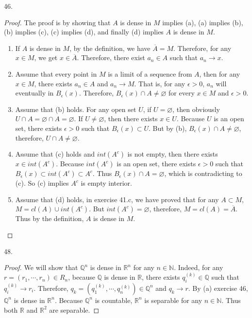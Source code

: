 \documentclass[12pt, a4paper]{article}
\theoremstyle{plain}
\newcommand{\N}{\mathbb{N}}
\newcommand{\Q}{\mathbb{Q}}
\newcommand{\R}{\mathbb{R}}
\begin{document}
46.
\begin{proof}
The proof is by showing that $A$ is dense in $M$ implies (a), (a) implies (b), (b) implies (c), (c) implies (d), and finally (d) implies $A$ is dense in $M$.
\hfill
\begin{enumerate}[label=(\roman*)]
\item If $A$ is dense in $M$, by the definition, we have $\overline{A}=M$. Therefore, for any $x\in M$, we get $x\in \overline{A}$. Therefore, there exist $a_n\in A$ such that $a_n\rightarrow x$.

\item Assume that every point in $M$ is a limit of a sequence from $A$, then for any $x\in M$, there exists $a_n\in A$ and $a_n\rightarrow M$. That is, for any $\epsilon>0$, $a_n$ will eventually in $B_\epsilon(x)$. Therefore, $B_\epsilon(x)\cap A\neq \varnothing$ for every $x\in M$ and $\epsilon>0$.

\item Assume that (b) holds. For any open set $U$, if $U=\varnothing$, then obviously $U\cap A=\varnothing\cap A=\varnothing$. If $U\neq \varnothing$, then there exists $x\in U$. Because $U$ is an open set, there exists $\epsilon>0$ such that $B_\epsilon(x)\subset U$. But by (b), $B_\epsilon(x)\cap A\neq \varnothing$, therefore, $U\cap A\neq \varnothing$.

\item Assume that (c) holds and $int(A^c)$ is not empty, then there exists $x\in int(A^c)$. Because $int(A^c)$ is an open set, there exists $\epsilon>0$ such that $B_\epsilon(x) \subset int(A^c)\subset A^c$. Thus $B_\epsilon(x)\cap A=\varnothing$, which is contradicting to (c). So (c) implies $A^c$ is empty interior.

\item Assume that (d) holds, in exercise 41.c, we have proved that for any $A\subset M$, $M=cl(A)\cup int(A^c)$. But $int(A^c)=\varnothing$, therefore, $M=cl(A)=\overline{A}$. Thus by the definition, $A$ is dense in $M$. 
\end{enumerate}
\end{proof}

48.
\begin{proof}
We will show that $\Q^n$ is dense in $\R^n$ for any $n\in \N$. Indeed, for any $r=(r_1,\cdots ,r_n)\in R_n$, because $\Q$ is dense in $\R$, there exists $q_i^{(k)}\in \Q$ such that $q_i^{(k)}\rightarrow r_i$. Therefore, $q_k=(q_1^{(k)},\cdots ,q_n^{(k)})\in \Q^n$ and $q_k\rightarrow r$. By (a) exercise 46, $\Q^n$ is dense in $\R^n$. Because $\Q^n$ is countable, $\R^n$ is separable for any $n\in\N$. Thus both $\R$ and $\R^2$ are separable.
\end{proof}
\end{document}
